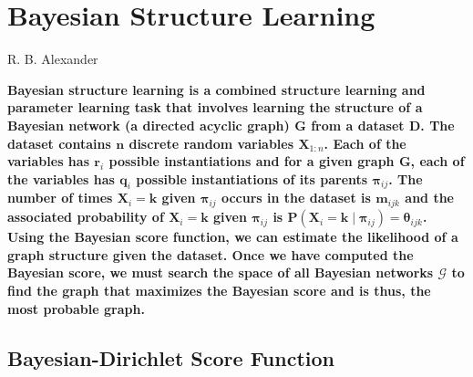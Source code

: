 \documentclass[10pt,letterpaper]{article}
\begin{document}
		
	
	\section*{\sf \textbf{Bayesian Structure Learning}}
	\vspace*{-0.1 in}
	{\noindent \sf \large R. B. Alexander}
	
	\vspace*{0.2 in}
	
\begin{adjustwidth}{1cm}{1cm}
		
	\noindent \textbf{Bayesian structure learning is a combined structure learning and parameter learning task that involves learning the structure of a Bayesian network (a directed acyclic graph) $\mathbf{G}$ from a dataset $\mathbf D$. The dataset contains $\mathbf n$ discrete random variables $\mathbf X_{1:n}$. Each of the variables has $\mathbf r_i$ possible instantiations and for a given graph $\mathbf G$, each of the variables has $\mathbf q_i$ possible instantiations of its parents $\boldsymbol \pi_{ij}$. The number of times $\mathbf X_i = \mathbf k$ given $\boldsymbol\pi_{ij}$ occurs in the dataset is $\mathbf m_{ijk}$ and the associated probability of $\mathbf X_i = \mathbf k$ given $\boldsymbol\pi_{ij}$ is $\mathbf P(\mathbf X_i = \mathbf{k} \mid \boldsymbol\pi_{ij}) = \boldsymbol\theta_{ijk}$. Using the Bayesian score function, we can estimate the likelihood of a graph structure given the dataset. Once we have computed the Bayesian score, we must search the space of all Bayesian networks $\boldsymbol{\mathcal{G}}$ to find the graph that maximizes the Bayesian score and is thus, the most probable graph.}
	
\end{adjustwidth}
					
	\subsection*{\sf \textbf{Bayesian-Dirichlet Score Function}}
	
\end{document}

